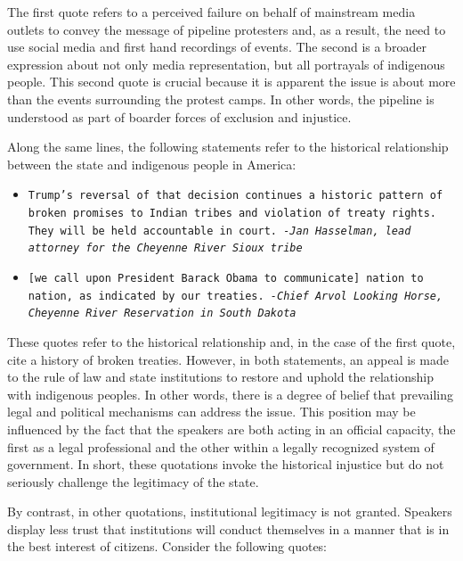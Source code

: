 The first quote refers to a perceived failure on behalf of mainstream media outlets to convey the message of pipeline protesters and, as a result, the need to use social media and first hand recordings of events. The second is a broader expression about not only media representation, but all portrayals of indigenous people. This second quote is crucial because it is apparent the issue is about more than the events surrounding the protest camps. In other words, the pipeline is understood as part of boarder forces of exclusion and injustice.

Along the same lines, the following statements refer to the historical relationship between the state and indigenous people in America:  
  
\begin{footnotesize}
\begin{itemize}
\item[] \texttt{Trump's reversal of that decision continues a historic pattern of broken promises to Indian tribes and violation of treaty rights. They will be held accountable in court. \newline 
\textit{-Jan Hasselman, lead attorney for the Cheyenne River Sioux tribe}}
\newline 
\item[] \texttt{[we call upon President Barack Obama to communicate] nation to nation, as indicated by our treaties. \newline 
\textit{-Chief Arvol Looking Horse, Cheyenne River Reservation in South Dakota}}
\end{itemize}
\end{footnotesize}  
  
These quotes refer to the historical relationship and, in the case of the first quote, cite a history of broken treaties. However, in both statements, an appeal is made to the rule of law and state institutions to restore and uphold the relationship with indigenous peoples. In other words, there is a degree of belief that prevailing legal and political mechanisms can address the issue. This position may be influenced by the fact that the speakers are both acting in an official capacity, the first as a legal professional and the other within a legally recognized system of government. In short, these quotations invoke the historical injustice but do not seriously challenge the legitimacy of the state.

By contrast, in other quotations, institutional legitimacy is not granted. Speakers display less trust that institutions will conduct themselves in a manner that is in the best interest of citizens. Consider the following quotes:

